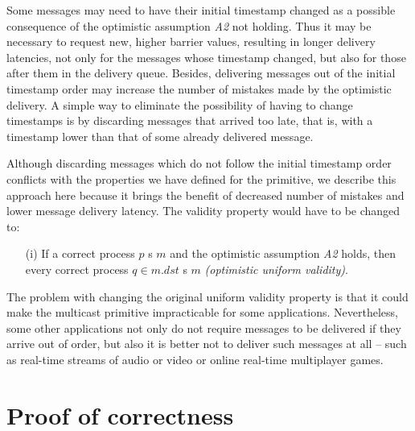 \documentclass[times, 10pt]{article}
\begin{document}
Some messages may need to have their initial timestamp changed as a possible consequence of the optimistic assumption \emph{A2} not holding. Thus it may be necessary to request new, higher barrier values, resulting in longer delivery latencies, not only for the messages whose timestamp changed, but also for those after them in the delivery queue. Besides, delivering messages out of the initial timestamp order may increase the number of mistakes made by the optimistic delivery. A simple way to eliminate the possibility of having to change timestamps is by discarding messages that arrived too late, that is, with a timestamp lower than that of some already delivered message.

Although discarding messages which do not follow the initial timestamp order conflicts with the properties we have defined for the \amcast{} primitive, we describe this approach here because it brings the benefit of decreased number of mistakes and lower message delivery latency. The validity property would have to be changed to:

\begin{itemize}
  \item[(i)] If a correct process $p$ \amcast{}s $m$ and the optimistic assumption \emph{A2} holds, then  every correct process $q \in m.dst$ \amdel{}s $m$ \emph{(optimistic uniform validity)}.
\end{itemize}


The problem with changing the original uniform validity property is that it could make the multicast primitive impracticable for some applications. Nevertheless, some other applications not only do not require messages to be delivered if they arrive out of order, but also it is better not to deliver such messages at all -- such as real-time streams of audio or video or online real-time multiplayer games.






\section{Proof of correctness}
\label{sec:proofs}
\end{document}
